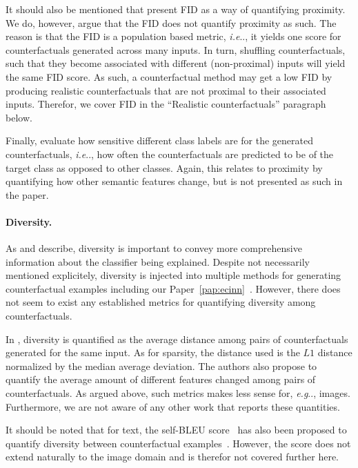 \documentclass[11pt,a4paper,twoside,openright,final]{memoir}
\makeatletter
\DeclareRobustCommand\onedot{\futurelet\@let@token\@onedot}
\def\@onedot{\ifx\@let@token.\else.\null\fi\xspace}
\def\eg{\emph{e.g}\onedot} \def\Eg{\emph{E.g}\onedot}
\def\ie{\emph{i.e}\onedot} \def\Ie{\emph{I.e}\onedot}
\newcommand*{\paperref}[1]{Paper~\hyperref[#1]{\ref{#1}}}
\makeatother
\begin{document}
It should also be mentioned that \cite{Rodriguez2021} present FID as a way of quantifying proximity.
We do, however, argue that the FID does not quantify proximity as such.
The reason is that the FID is a population based metric, \ie, it yields one score for counterfactuals generated across many inputs.
In turn, shuffling counterfactuals, such that they become associated with different (non-proximal) inputs will yield the same FID score.
As such, a counterfactual method may get a low FID by producing realistic counterfactuals that are not proximal to their associated inputs.
Therefor, we cover FID in the ``Realistic counterfactuals'' paragraph below. 

Finally, \citet{Singla2019} evaluate how sensitive different class labels are for the generated counterfactuals, \ie, how often the counterfactuals are predicted to be of the target class as opposed to other classes.
Again, this relates to proximity by quantifying how other semantic features change, but is not presented as such in the paper. 

\paragraph{Diversity.}
As \citet{Mothilal2020} and \citet{Wachter2017} describe, diversity is important to convey more comprehensive information about the classifier being explained.
Despite not necessarily mentioned explicitely, diversity is injected into multiple methods for generating counterfactual examples including our \paperref{pap:ecinn}~\cite{Joshi2018, Singla2019, Rodriguez2021}. 
However, there does not seem to exist any established metrics for quantifying diversity among counterfactuals.

In \cite{Mothilal2020}, diversity is quantified as the average distance among pairs of counterfactuals generated for the same input. 
As for sparsity, the distance used is the $L1$ distance normalized by the median average deviation.
The authors also propose to quantify the average amount of different features changed among pairs of counterfactuals.
As argued above, such metrics makes less sense for, \eg, images.
Furthermore, we are not aware of any other work that reports these quantities.

It should be noted that for text, the self-BLEU score~\cite{self-bleu} has also been proposed to quantify diversity between counterfactual examples~\cite{Wu2021}.
However, the score does not extend naturally to the image domain and is therefor not covered further here.
\end{document}
